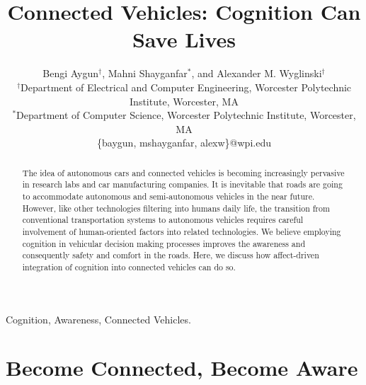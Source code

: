 \documentclass[journal, 11pt]{IEEEtran}
\begin{document}
\title{Connected Vehicles: Cognition Can Save Lives}

\author{Bengi Aygun$^\dag$, Mahni Shayganfar$^*$, and Alexander M.
Wyglinski$^\dag$\\
\normalsize $^\dag$Department of Electrical and Computer Engineering, Worcester
Polytechnic Institute, Worcester, MA\\
\normalsize $^*$Department of Computer Science, Worcester Polytechnic Institute,
Worcester, MA\\
\normalsize \{baygun, mshayganfar, alexw\}@wpi.edu}

\maketitle

\begin{abstract}
The idea of autonomous cars and connected vehicles is becoming increasingly
pervasive in research labs and car manufacturing companies. It is inevitable
that roads are going to accommodate autonomous and semi-autonomous vehicles
in the near future. However, like other technologies filtering into humans
daily life, the transition from conventional transportation systems to
autonomous vehicles requires careful involvement of human-oriented factors into
related technologies. We believe employing cognition in vehicular decision
making processes improves the awareness and consequently safety and comfort in
the roads. Here, we discuss how affect-driven integration of cognition into
connected vehicles can do so.
\end{abstract}

\begin{keywords}
Cognition, Awareness, Connected Vehicles.
\end{keywords}%

\IEEEpeerreviewmaketitle

\section{Become Connected, Become Aware}
\end{document}
